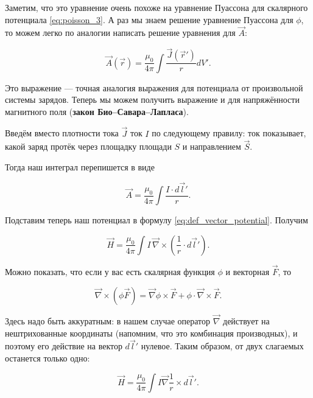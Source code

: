 \documentclass[12pt,a4paper]{article}
\numberwithin{equation}{section}
\numberwithin{equation}{section}
\newcommand{\vn}{\vec{\nabla}}
\begin{document}
Заметим, что это уравнение очень похоже на уравнение Пуассона для
скалярного потенциала \eqref{eq:poisson_3}. А раз мы знаем решение
уравнение Пуассона для $\phi$, то можем легко по аналогии написать
решение уравнения для $\vec{A}$: 

\begin{equation}
  \label{eq:solution_vector_pot}
  \vec{A}(\vec{r}) = \frac{\mu_0}{4\pi} \int \frac{\vec{J}(\vec{r}')}{r} dV'.
\end{equation}

Это выражение --- точная аналогия выражения для потенциала от
произвольной системы зарядов. Теперь мы можем получить выражение и для
напряжённости магнитного поля (\textbf{закон
  Био--Савара--Лапласа}). 

Введём вместо плотности тока $\vec{J}$ ток $I$ по следующему правилу:
ток показывает, какой заряд протёк через площадку площади $S$ и
направлением $\vec{S}$.

Тогда наш интеграл перепишется в виде

\begin{equation}
  \label{eq:der_bio-savart-laplace}
  \vec{A} = \frac{\mu_0}{4\pi} \int \frac{I \cdot d\vec{l}'}{r}.
\end{equation}

Подставим теперь наш потенциал в формулу
\eqref{eq:def_vector_potential}. Получим

\begin{equation}
  \label{eq:bio-savart-laplace_1}
  \vec{H} =\frac{\mu_0}{4\pi} \int I\, \vn \times \left( \frac{1}{r} \cdot d\vec{l}' \right).
\end{equation}

Можно показать, что если у вас есть скалярная функция $\phi$ и
векторная $\vec{F}$, то

\begin{equation}
  \label{eq:rot_prop}
  \vn \times (\phi \vec{F}) = \vn \phi \times \vec{F} + \phi \cdot \vn
  \times \vec{F}.
\end{equation}

Здесь надо быть аккуратным: в нашем случае оператор $\vn$ действует на нештрихованные
координаты (напомним, что это комбинация производных), и поэтому его
действие на вектор $d\vec{l}'$ нулевое. Таким образом, от двух
слагаемых останется только одно: 

\begin{equation}
  \label{eq:der_bio-savart-laplace_2}
  \vec{H} = \frac{\mu_0}{4\pi} \int I \vn \frac{1}{r} \times d\vec{l}'.
\end{equation}
\end{document}
